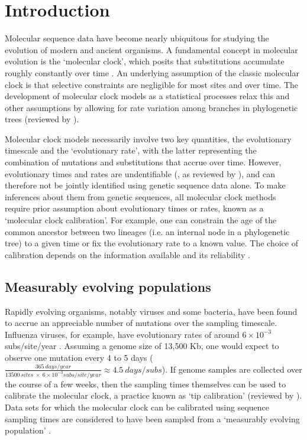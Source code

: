 \documentclass[11pt]{article}
\begin{document}
\section{Introduction}
Molecular sequence data have become nearly ubiquitous for studying the evolution of modern and ancient organisms. A fundamental concept in molecular evolution is the `molecular clock', which posits that substitutions accumulate roughly constantly over time \citep{zuckerkandl1965evolutionary}. An underlying assumption of the classic molecular clock is that selective constraints are negligible for most sites and over time. The development of molecular clock models as a statistical processes relax this and other assumptions by allowing for rate variation among branches in phylogenetic trees (reviewed by \cite{ho2014molecular}).

Molecular clock models necessarily involve two key quantities, the evolutionary timescale and the `evolutionary rate', with the latter representing the combination of mutations and substitutions that accrue over time. However, evolutionary times and rates are undentifiable (\cite{dos2013unbearable}, as reviewed by \cite{bromham2018bayesian}), and can therefore not be jointly identified using genetic sequence data alone. To make inferences about them from genetic sequences, all molecular clock methods require prior assumption about evolutionary times or rates, known as a `molecular clock calibration'. For example, one can constrain the age of the common ancestor between two lineages (i.e. an internal node in a phylogenetic tree) to a given time or fix the evolutionary rate to a known value. The choice of calibration depends on the information available and its reliability \citep{warnock2012exploring, duchene2014impact}. 

\subsection{Measurably evolving populations}
Rapidly evolving organisms, notably viruses and some bacteria, have been found to accrue an appreciable number of mutations over the sampling timescale. Influenza viruses, for example, have evolutionary rates of around $6\times10^{-3}$ subs/site/year \citep{ghafari2021purifying, sanjuan2012molecular}. Assuming a genome size of 13,500 Kb, one would expect to observe one mutation every 4 to 5 days ($\frac{365\ days/year}{13500\ sites\ \times\ 6\times10^{-3}subs/site/year}\approx4.5\ days/subs$). If genome samples are collected over the course of a few weeks, then the sampling times themselves can be used to calibrate the molecular clock, a practice known as `tip calibration' (reviewed by \cite{rieux2016inferences}). Data sets for which the molecular clock can be calibrated using sequence sampling times are considered to have been sampled from a `measurably evolving population' \citep{drummond2003measurably}.
\end{document}
